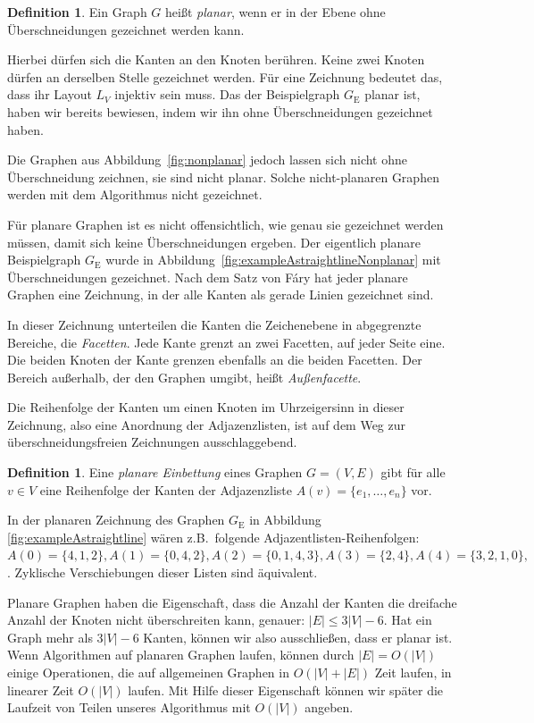 \documentclass[a4paper]{scrreprt}
\theoremstyle{definition}
\newtheorem{definition}[satz]{Definition}
\begin{document}
\begin{definition}
  Ein Graph $G$ heißt \emph{planar}, wenn er in der Ebene ohne Überschneidungen gezeichnet werden kann.
\end{definition}

Hierbei dürfen sich die Kanten an den Knoten berühren. Keine zwei Knoten dürfen an derselben Stelle gezeichnet werden. Für eine Zeichnung bedeutet das, dass ihr Layout $L_V$ injektiv sein muss. Das der Beispielgraph $G_\text{E}$ planar ist, haben wir bereits bewiesen, indem wir ihn ohne Überschneidungen gezeichnet haben. 

Die Graphen aus Abbildung~\ref{fig:nonplanar} jedoch lassen sich nicht ohne Überschneidung zeichnen, sie sind nicht planar. Solche nicht-planaren Graphen werden mit dem Algorithmus nicht gezeichnet. 

Für planare Graphen ist es nicht offensichtlich, wie genau sie gezeichnet werden müssen, damit sich keine Überschneidungen ergeben. Der eigentlich planare Beispielgraph $G_\text{E}$ wurde in Abbildung~\ref{fig:exampleAstraightlineNonplanar} mit Überschneidungen gezeichnet. Nach dem Satz von Fáry hat jeder planare Graphen eine Zeichnung, in der alle Kanten als gerade Linien gezeichnet sind.

In dieser Zeichnung unterteilen die Kanten die Zeichenebene in abgegrenzte Bereiche, die \emph{Facetten}. Jede Kante grenzt an zwei Facetten, auf jeder Seite eine. Die beiden Knoten der Kante grenzen ebenfalls an die beiden Facetten. Der Bereich außerhalb, der den Graphen umgibt, heißt \emph{Außenfacette}.

Die Reihenfolge der Kanten um einen Knoten im Uhrzeigersinn in dieser Zeichnung, also eine Anordnung der Adjazenzlisten, ist auf dem Weg zur überschneidungsfreien Zeichnungen ausschlaggebend.


\begin{definition}
  Eine \emph{planare Einbettung} eines Graphen $G = (V, E)$ gibt für alle $v \in V$ eine Reihenfolge der Kanten der Adjazenzliste $A(v) = \{e_1, \dots, e_n\}$ vor.
\end{definition}

In der planaren Zeichnung des Graphen $G_\text{E}$ in Abbildung~ \ref{fig:exampleAstraightline} wären z.B.\ folgende Adjazentlisten-Reihenfolgen: $A(0) = \{4,1,2\}, A(1) = \{0,4,2\}, A(2) = \{0,1,4,3\}, A(3) = \{2,4\}, A(4) = \{3,2,1,0\}, $. Zyklische Verschiebungen dieser Listen sind äquivalent.

Planare Graphen haben die Eigenschaft, dass die Anzahl der Kanten die dreifache Anzahl der Knoten nicht überschreiten kann, genauer: $|E| \leq 3 |V| - 6$. Hat ein Graph mehr als $3 |V| - 6$ Kanten, können wir also ausschließen, dass er planar ist. Wenn Algorithmen auf planaren Graphen laufen, können durch $|E| = O(|V|)$ einige Operationen, die auf allgemeinen Graphen in $O(|V| + |E|)$ Zeit laufen, in linearer Zeit $O(|V|)$ laufen. Mit Hilfe dieser Eigenschaft können wir später die Laufzeit von Teilen unseres Algorithmus mit $O(|V|)$ angeben.
\end{document}
